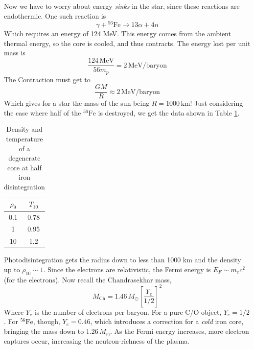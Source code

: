 \documentclass[10pt]{article}
\numberwithin{equation}{section}
\newcommand{\n}{\noindent}
\begin{document}
	\n Now we have to worry about energy \emph{sinks} in the star,
        since these reactions are endothermic. One such reaction  is
	\begin{equation}
	\label{eq:367} \gamma+{}^{56}\mathrm{Fe}\to 13\alpha+4n
	\end{equation}
	Which requires an energy of 124 MeV. This energy comes from
        the ambient thermal energy, so the core is cooled, and thus
        contracts. The energy lost per unit mass is 
	\begin{equation}
	\label{eq:368}
        \frac{124\,\mathrm{MeV}}{56m_{p}}=2\,\mathrm{MeV/baryon} 
	\end{equation}
	The Contraction must get to
	\begin{equation}
	\frac{GM}{R}\approx 2\,\mathrm{MeV/baryon}
	\end{equation}
	Which gives for a star the mass of the sun being
        $R=1000\,\mathrm{km}$! Just considering the case where half of
        the ${}^{56}\mathrm{Fe}$ is destroyed, we get the data shown
        in Table \ref{tab:iron}.\\ 
	\begin{table}[h!]
	\centering
	\begin{tabular}{cc}
		$\rho_{9}$ & $T_{10}$\\
		\hline \hline
		0.1 & 0.78\\
		1 & 0.95\\
		10 & 1.2
	\end{tabular}
	\caption{Density and temperature of a degenerate core at half
          iron disintegration} 
	\label{tab:iron}
	\end{table}
	
	\n Photodisintegration gets the radius down to less than 1000
        km and the density up to $\rho_{10}\sim 1$. Since the
        electrons are relativistic, the Fermi energy is $E_{F}\sim
        m_{e}c^{2}$ (for the electrons). Now recall the Chandrasekhar
        mass, 
	\begin{equation}
	\label{eq:369}
        M_{\mathrm{Ch}}=1.46\,M_{\odot}\left[\frac{Y_{e}}{1/2}\right]^{2} 
	\end{equation}
	Where $Y_{e}$ is the number of electrons per baryon. For a
        pure C/O object, $Y_{e}=1/2$. For ${}^{56}\mathrm{Fe}$,
        though, $Y_{e}=0.46$, which introduces a correction for a
        \emph{cold} iron core, bringing the mass down to
        $1.26\,M_{\odot}$. As the Fermi energy increases, more
        electron captures occur, increasing the neutron-richness of
        the plasma.\\ 
	
\end{document}

